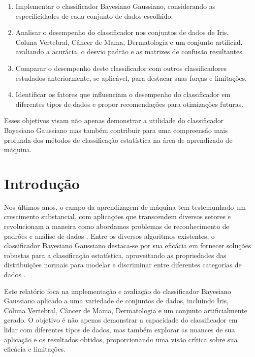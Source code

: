 \documentclass[12pt, a4paper]{report}
\begin{document}
\begin{enumerate}
    \item Implementar o classificador Bayesiano Gaussiano, considerando as especificidades de cada conjunto de dados escolhido.
    \item Analisar o desempenho do classificador nos conjuntos de dados de Iris, Coluna Vertebral, Câncer de Mama, Dermatologia e um conjunto artificial, avaliando a acurácia, o desvio padrão e as matrizes de confusão resultantes.
    \item Comparar o desempenho deste classificador com outros classificadores estudados anteriormente, se aplicável, para destacar suas forças e limitações.
    \item Identificar os fatores que influenciam o desempenho do classificador em diferentes tipos de dados e propor recomendações para otimizações futuras.
\end{enumerate}

Esses objetivos visam não apenas demonstrar a utilidade do classificador Bayesiano Gaussiano mas também contribuir para uma compreensão mais profunda dos métodos de classificação estatística na área de aprendizado de máquina.

\chapter{Introdução}

Nos últimos anos, o campo da aprendizagem de máquina tem testemunhado um crescimento substancial, com aplicações que transcendem diversos setores e revolucionam a maneira como abordamos problemas de reconhecimento de padrões e análise de dados \cite{bishop2006pattern}. Entre os diversos algoritmos existentes, o classificador Bayesiano Gaussiano destaca-se por sua eficácia em fornecer soluções robustas para a classificação estatística, aproveitando as propriedades das distribuições normais para modelar e discriminar entre diferentes categorias de dados \cite{murphy2012machine}.

Este relatório foca na implementação e avaliação do classificador Bayesiano Gaussiano aplicado a uma variedade de conjuntos de dados, incluindo Iris, Coluna Vertebral, Câncer de Mama, Dermatologia e um conjunto artificialmente gerado. O objetivo é não apenas demonstrar a capacidade do classificador em lidar com diferentes tipos de dados, mas também explorar as nuances de sua aplicação e os resultados obtidos, proporcionando uma visão crítica sobre sua eficácia e limitações.
\end{document}
